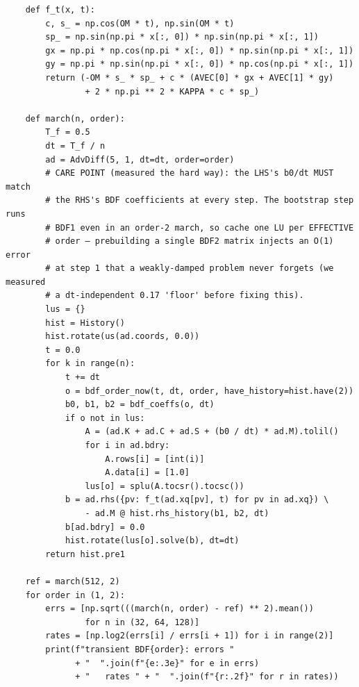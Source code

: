 \begin{lstlisting}
    def f_t(x, t):
        c, s_ = np.cos(OM * t), np.sin(OM * t)
        sp_ = np.sin(np.pi * x[:, 0]) * np.sin(np.pi * x[:, 1])
        gx = np.pi * np.cos(np.pi * x[:, 0]) * np.sin(np.pi * x[:, 1])
        gy = np.pi * np.sin(np.pi * x[:, 0]) * np.cos(np.pi * x[:, 1])
        return (-OM * s_ * sp_ + c * (AVEC[0] * gx + AVEC[1] * gy)
                + 2 * np.pi ** 2 * KAPPA * c * sp_)

    def march(n, order):
        T_f = 0.5
        dt = T_f / n
        ad = AdvDiff(5, 1, dt=dt, order=order)
        # CARE POINT (measured the hard way): the LHS's b0/dt MUST match
        # the RHS's BDF coefficients at every step. The bootstrap step runs
        # BDF1 even in an order-2 march, so cache one LU per EFFECTIVE
        # order — prebuilding a single BDF2 matrix injects an O(1) error
        # at step 1 that a weakly-damped problem never forgets (we measured
        # a dt-independent 0.17 'floor' before fixing this).
        lus = {}
        hist = History()
        hist.rotate(us(ad.coords, 0.0))
        t = 0.0
        for k in range(n):
            t += dt
            o = bdf_order_now(t, dt, order, have_history=hist.have(2))
            b0, b1, b2 = bdf_coeffs(o, dt)
            if o not in lus:
                A = (ad.K + ad.C + ad.S + (b0 / dt) * ad.M).tolil()
                for i in ad.bdry:
                    A.rows[i] = [int(i)]
                    A.data[i] = [1.0]
                lus[o] = splu(A.tocsr().tocsc())
            b = ad.rhs({pv: f_t(ad.xq[pv], t) for pv in ad.xq}) \
                - ad.M @ hist.rhs_history(b1, b2, dt)
            b[ad.bdry] = 0.0
            hist.rotate(lus[o].solve(b), dt=dt)
        return hist.pre1

    ref = march(512, 2)
    for order in (1, 2):
        errs = [np.sqrt(((march(n, order) - ref) ** 2).mean())
                for n in (32, 64, 128)]
        rates = [np.log2(errs[i] / errs[i + 1]) for i in range(2)]
        print(f"transient BDF{order}: errors "
              + "  ".join(f"{e:.3e}" for e in errs)
              + "   rates " + "  ".join(f"{r:.2f}" for r in rates))
\end{lstlisting}

